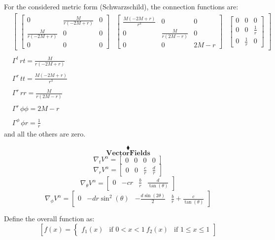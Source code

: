 For the considered metric form (Schwarzschild), the connection functions are:
\begin{align}
&\left[\begin{matrix}\left[\begin{matrix}0 & \frac{M}{r \left(- 2 M + r\right)} & 0\\\frac{M}{r \left(- 2 M + r\right)} & 0 & 0\\0 & 0 & 0\end{matrix}\right] & \left[\begin{matrix}\frac{M \left(- 2 M + r\right)}{r^{3}} & 0 & 0\\0 & \frac{M}{r \left(2 M - r\right)} & 0\\0 & 0 & 2 M - r\end{matrix}\right] & \left[\begin{matrix}0 & 0 & 0\\0 & 0 & \frac{1}{r}\\0 & \frac{1}{r} & 0\end{matrix}\right]\end{matrix}\right]\\\\
&\Gamma^{t}{\,rt}= \frac{M}{r \left(- 2 M + r\right)}\\\\
&\Gamma^{r}{\,tt}= \frac{M \left(- 2 M + r\right)}{r^{3}}\\\\
&\Gamma^{r}{\,rr}= \frac{M}{r \left(2 M - r\right)}\\\\
&\Gamma^{r}{\,\phi\phi}= 2 M - r\\\\
&\Gamma^{\phi}{\,\phi r}= \frac{1}{r}
\end{align}
and all the others are zero.

$$\blacklozenge$$\newpage
\newpage
\newpage
$$\mathbf{Vector Fields}$$
\newpage
$$\nabla_{t}V^{\alpha} = \left[\begin{matrix}0 & 0 & 0 & 0\end{matrix}\right]$$
$$\nabla_{r}V^{\alpha} = \left[\begin{matrix}0 & 0 & \frac{c}{r} & \frac{d}{r}\end{matrix}\right]$$
$$\nabla_{\theta}V^{\alpha} = \left[\begin{matrix}0 & - c r & \frac{b}{r} & \frac{d}{\tan{\left(\theta \right)}}\end{matrix}\right]$$
$$\nabla_{\phi}V^{\alpha} = \left[\begin{matrix}0 & - d r \sin^{2}{\left(\theta \right)} & - \frac{d \sin{\left(2 \theta \right)}}{2} & \frac{b}{r} + \frac{c}{\tan{\left(\theta \right)}}\end{matrix}\right]$$


Define the overall function as:
$$[ f(x) = \begin{cases} f_1(x) & \text{if } 0 < x < 1 \ f_2(x) & \text{if } 1 \leq x \leq 1 \end{cases} ]$$

